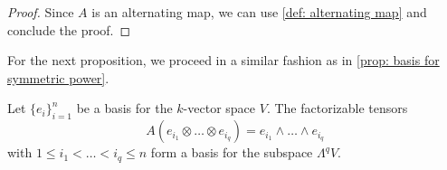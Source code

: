 \begin{proof}
    Since \(A\) is an alternating map, we can use \cref{def: alternating map} and
    conclude the proof.
\end{proof}

For the next proposition, we proceed in a similar fashion as in \cref{prop:
    basis for symmetric power}.

\begin{proposition}
    \label{prop: exterior power basis}
    Let \(\{e_i\}_{i=1}^n\) be a basis for the \(k\)-vector space \(V\). The
    factorizable tensors
    \[
        A(e_{i_1} \otimes \dots \otimes e_{i_q}) = e_{i_1} \wedge \dots \wedge
        e_{i_q}
    \]
    with \(1 \leq i_1 < \dots < i_q \leq n\) form a basis for the subspace
    \(\Lambda^q V\).
\end{proposition}


